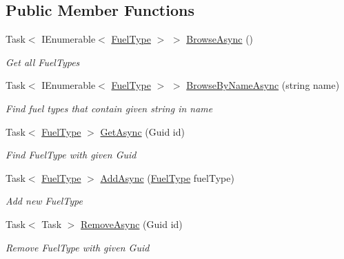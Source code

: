 \subsection*{Public Member Functions}
\begin{DoxyCompactItemize}
\item 
Task$<$ I\+Enumerable$<$ \mbox{\hyperlink{class_gasoline_1_1_data_1_1_models_1_1_fuel_type}{Fuel\+Type}} $>$ $>$ \mbox{\hyperlink{interface_gasoline_1_1_data_1_1_services_1_1_i_fuel_type_service_a7d27b8b4793ab2ac48f24c78d681469b}{Browse\+Async}} ()
\begin{DoxyCompactList}\small\item\em Get all Fuel\+Types \end{DoxyCompactList}\item 
Task$<$ I\+Enumerable$<$ \mbox{\hyperlink{class_gasoline_1_1_data_1_1_models_1_1_fuel_type}{Fuel\+Type}} $>$ $>$ \mbox{\hyperlink{interface_gasoline_1_1_data_1_1_services_1_1_i_fuel_type_service_a3641a00f790e0aabb9decc8e9a5e7dc9}{Browse\+By\+Name\+Async}} (string name)
\begin{DoxyCompactList}\small\item\em Find fuel types that contain given string in name \end{DoxyCompactList}\item 
Task$<$ \mbox{\hyperlink{class_gasoline_1_1_data_1_1_models_1_1_fuel_type}{Fuel\+Type}} $>$ \mbox{\hyperlink{interface_gasoline_1_1_data_1_1_services_1_1_i_fuel_type_service_a3abc3e8b5c004ce0da2645017c971114}{Get\+Async}} (Guid id)
\begin{DoxyCompactList}\small\item\em Find Fuel\+Type with given Guid \end{DoxyCompactList}\item 
Task$<$ \mbox{\hyperlink{class_gasoline_1_1_data_1_1_models_1_1_fuel_type}{Fuel\+Type}} $>$ \mbox{\hyperlink{interface_gasoline_1_1_data_1_1_services_1_1_i_fuel_type_service_aca2418fb4b12a5d3b0663cc01647a1fa}{Add\+Async}} (\mbox{\hyperlink{class_gasoline_1_1_data_1_1_models_1_1_fuel_type}{Fuel\+Type}} fuel\+Type)
\begin{DoxyCompactList}\small\item\em Add new Fuel\+Type \end{DoxyCompactList}\item 
Task$<$ Task $>$ \mbox{\hyperlink{interface_gasoline_1_1_data_1_1_services_1_1_i_fuel_type_service_adf2b22c96b7badbb188a3399eef01b0d}{Remove\+Async}} (Guid id)
\begin{DoxyCompactList}\small\item\em Remove Fuel\+Type with given Guid \end{DoxyCompactList}\end{DoxyCompactItemize}


